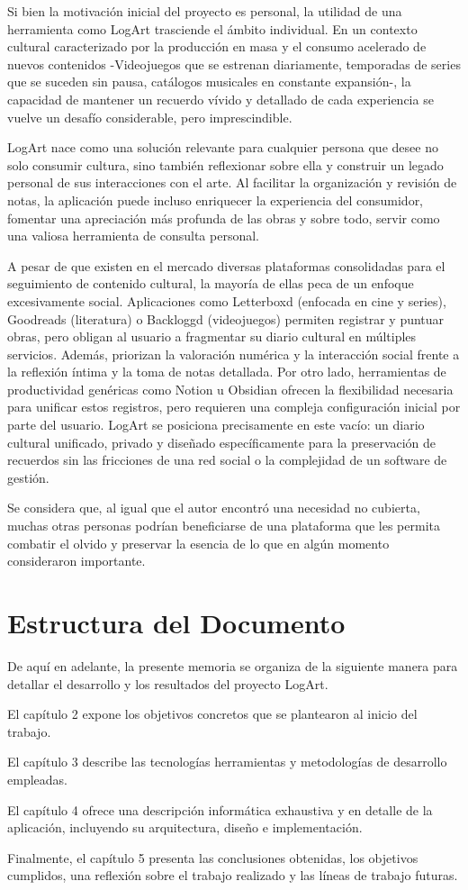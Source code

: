 Si bien la motivación inicial del proyecto es personal, la utilidad de una herramienta como LogArt trasciende el ámbito individual. En un contexto cultural caracterizado por la producción en masa y el consumo acelerado de nuevos contenidos -Videojuegos que se estrenan diariamente\cite{xatakaSaturacionVideojuegos}, temporadas de series que se suceden sin pausa, catálogos musicales en constante expansión-, la capacidad de mantener un recuerdo vívido y detallado de cada experiencia se vuelve un desafío considerable, pero imprescindible.

LogArt nace como una solución relevante para cualquier persona que desee no solo consumir cultura, sino también reflexionar sobre ella y construir un legado personal de sus interacciones con el arte. Al facilitar la organización y revisión de notas, la aplicación puede incluso enriquecer la experiencia del consumidor, fomentar una apreciación más profunda de las obras y sobre todo, servir como una valiosa herramienta de consulta personal.

A pesar de que existen en el mercado diversas plataformas consolidadas para el seguimiento de contenido cultural, la mayoría de ellas peca de un enfoque excesivamente social. Aplicaciones como Letterboxd (enfocada en cine y series), Goodreads (literatura) o Backloggd (videojuegos) permiten registrar y puntuar obras, pero obligan al usuario a fragmentar su diario cultural en múltiples servicios. Además, priorizan la valoración numérica y la interacción social frente a la reflexión íntima y la toma de notas detallada. Por otro lado, herramientas de productividad genéricas como Notion u Obsidian ofrecen la flexibilidad necesaria para unificar estos registros, pero requieren una compleja configuración inicial por parte del usuario. LogArt se posiciona precisamente en este vacío: un diario cultural unificado, privado y diseñado específicamente para la preservación de recuerdos sin las fricciones de una red social o la complejidad de un software de gestión.

Se considera que, al igual que el autor encontró una necesidad no cubierta, muchas otras personas podrían beneficiarse de una plataforma que les permita combatir el olvido y preservar la esencia de lo que en algún momento consideraron importante.

\section{Estructura del Documento}

De aquí en adelante, la presente memoria se organiza de la siguiente manera para detallar el desarrollo y los resultados del proyecto LogArt.

El capítulo 2 expone los objetivos concretos que se plantearon al inicio del trabajo.

El capítulo 3 describe las tecnologías herramientas y metodologías de desarrollo empleadas.

El capítulo 4 ofrece una descripción informática exhaustiva y en detalle de la aplicación, incluyendo su arquitectura, diseño e implementación.

Finalmente, el capítulo 5 presenta las conclusiones obtenidas, los objetivos cumplidos, una reflexión sobre el trabajo realizado y las líneas de trabajo futuras.

